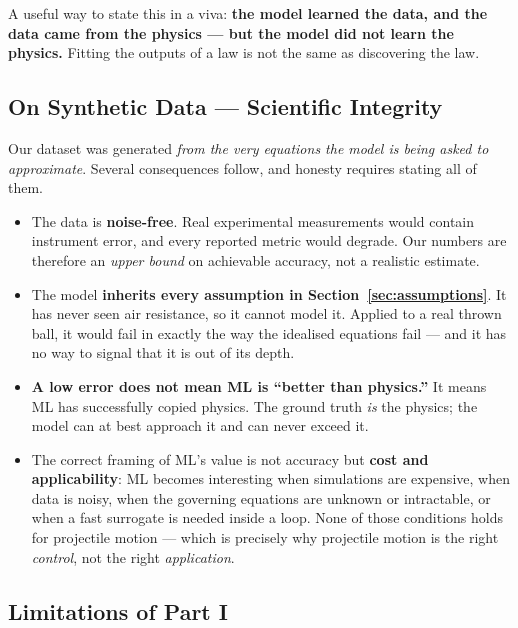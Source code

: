 \documentclass[11pt,a4paper]{article}
\begin{document}
A useful way to state this in a viva: \textbf{the model learned the data, and the data came from the
physics --- but the model did not learn the physics.} Fitting the outputs of a law is not the same as
discovering the law.

\subsection{On Synthetic Data --- Scientific Integrity}\label{sec:integrity}

Our dataset was generated \emph{from the very equations the model is being asked to approximate}.
Several consequences follow, and honesty requires stating all of them.

\begin{itemize}[leftmargin=2em,itemsep=0.25em]
  \item The data is \textbf{noise-free}. Real experimental measurements would contain instrument
        error, and every reported metric would degrade. Our numbers are therefore an \emph{upper
        bound} on achievable accuracy, not a realistic estimate.
  \item The model \textbf{inherits every assumption in Section~\ref{sec:assumptions}}. It has never
        seen air resistance, so it cannot model it. Applied to a real thrown ball, it would fail in
        exactly the way the idealised equations fail --- and it has no way to signal that it is out
        of its depth.
  \item \textbf{A low error does not mean ML is ``better than physics.''} It means ML has
        successfully copied physics. The ground truth \emph{is} the physics; the model can at best
        approach it and can never exceed it.
  \item The correct framing of ML's value is not accuracy but \textbf{cost and applicability}: ML
        becomes interesting when simulations are expensive, when data is noisy, when the governing
        equations are unknown or intractable, or when a fast surrogate is needed inside a loop. None
        of those conditions holds for projectile motion --- which is precisely why projectile motion
        is the right \emph{control}, not the right \emph{application}.
\end{itemize}

\subsection{Limitations of Part I}\label{sec:limitations}
\end{document}
